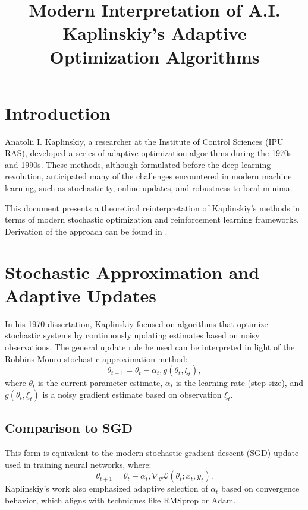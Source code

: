 \documentclass[12pt]{article}
\title{Modern Interpretation of A.I. Kaplinskiy's Adaptive Optimization Algorithms}
\author{}
\date{}
\begin{document}
\maketitle

\section{Introduction}
Anatolii I. Kaplinskiy, a researcher at the Institute of Control Sciences (IPU RAS), developed a series of adaptive optimization algorithms during the 1970s and 1990s. These methods, although formulated before the deep learning revolution, anticipated many of the challenges encountered in modern machine learning, such as stochasticity, online updates, and robustness to local minima.

This document presents a theoretical reinterpretation of Kaplinskiy's methods in terms of modern stochastic optimization and reinforcement learning frameworks. Derivation of the approach can be found in \cite{KAP2,KAP3}.

\section{Stochastic Approximation and Adaptive Updates}
In his 1970 dissertation, Kaplinskiy focused on algorithms that optimize stochastic systems by continuously updating estimates based on noisy observations. The general update rule he used can be interpreted in light of the Robbins-Monro stochastic approximation method:
\begin{equation}
\theta_{t+1} = \theta_t - \alpha_t , g(\theta_t, \xi_t),
\end{equation}
where $\theta_t$ is the current parameter estimate, $\alpha_t$ is the learning rate (step size), and $g(\theta_t, \xi_t)$ is a noisy gradient estimate based on observation $\xi_t$.


\subsection*{Comparison to SGD}
This form is equivalent to the modern stochastic gradient descent (SGD) update used in training neural networks, where:
\begin{equation}
\theta_{t+1} = \theta_t - \alpha_t , \nabla_\theta \mathcal{L}(\theta_t; x_t, y_t).
\end{equation}
Kaplinskiy's work also emphasized adaptive selection of $\alpha_t$ based on convergence behavior, which aligns with techniques like RMSprop or Adam.
\end{document}
